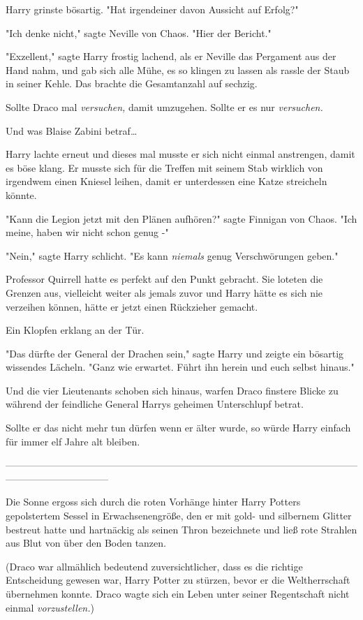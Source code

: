 {Harry grinste bösartig. "Hat irgendeiner davon Aussicht auf Erfolg?"

"Ich denke nicht," sagte Neville von Chaos. "Hier der Bericht."

"Exzellent," sagte Harry frostig lachend, als er Neville das Pergament aus der Hand nahm, und gab sich alle Mühe, es so klingen zu lassen als rassle der Staub in seiner Kehle. Das brachte die Gesamtanzahl auf sechzig.

Sollte Draco mal \emph{versuchen,} damit umzugehen. Sollte er es nur \emph{versuchen.}

Und was Blaise Zabini betraf…

Harry lachte erneut und dieses mal musste er sich nicht einmal anstrengen, damit es böse klang. Er musste sich für die Treffen mit seinem Stab wirklich von irgendwem einen Kniesel leihen, damit er unterdessen eine Katze streicheln könnte.

"Kann die Legion jetzt mit den Plänen aufhören?" sagte Finnigan von Chaos. "Ich meine, haben wir nicht schon genug -"

"Nein," sagte Harry schlicht. "Es kann \emph{niemals} genug Verschwörungen geben."

Professor Quirrell hatte es perfekt auf den Punkt gebracht. Sie loteten die Grenzen aus, vielleicht weiter als jemals zuvor und Harry hätte es sich nie verzeihen können, hätte er jetzt einen Rückzieher gemacht.

Ein Klopfen erklang an der Tür.

"Das dürfte der General der Drachen sein," sagte Harry und zeigte ein bösartig wissendes Lächeln. "Ganz wie erwartet. Führt ihn herein und euch selbst hinaus."

Und die vier Lieutenants schoben sich hinaus, warfen Draco finstere Blicke zu während der feindliche General Harrys geheimen Unterschlupf betrat.

Sollte er das nicht mehr tun dürfen wenn er älter wurde, so würde Harry einfach für immer elf Jahre alt bleiben.

--------------------------------------------------------------------------------------------------------------------------------------------

Die Sonne ergoss sich durch die roten Vorhänge hinter Harry Potters gepolstertem Sessel in Erwachsenengröße, den er mit gold- und silbernem Glitter bestreut hatte und hartnäckig als seinen Thron bezeichnete und ließ rote Strahlen aus Blut von über den Boden tanzen.

(Draco war allmählich bedeutend zuversichtlicher, dass es die richtige Entscheidung gewesen war, Harry Potter zu stürzen, bevor er die Weltherrschaft übernehmen konnte. Draco wagte sich ein Leben unter seiner Regentschaft nicht einmal \emph{vorzustellen.})

}
